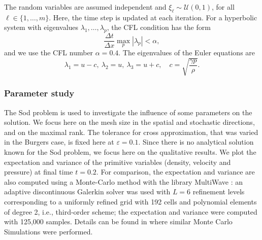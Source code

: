 \documentclass{article}
\begin{document}
The random variables are assumed independent and $\xi_\ell \sim \mathcal U(0,1)$, for all $\ell \in \{1,\dots,m\}$. 
Here, the time step is updated at each iteration. 
For a hyperbolic system with eigenvalues $\lambda_1,\dots,\lambda_p$, the CFL condition has the form 
\begin{equation} 
    \frac{\Delta t}{\Delta x}
    \max_p |\lambda_p| < \alpha,
\end{equation}
and we use the CFL number $\alpha=0.4$. The eigenvalues of the Euler equations are 
\begin{equation}
    \lambda_1 = u-c, \ \lambda_2 = u, \ \lambda_3 = u+c,
    \quad c = \sqrt{\frac{\gamma p}{\rho}}. 
\end{equation}

\subsubsection{Parameter study}

The Sod problem is used to investigate the influence of some parameters on the solution. 
We focus here on the mesh size in the spatial and stochastic directions, and on the maximal rank. 
The tolerance for cross approximation, that was varied in the Burgers case, is  fixed here at $\varepsilon=0.1$. 
Since there is no analytical solution known for the Sod problem, we focus here on the qualitative results.
We plot the expectation and variance of the primitive variables (density, velocity and pressure) at final time $t=0.2$.
For comparison, the expectation and variance are also computed using a Monte-Carlo method with the library MultiWave 
\cite{GerhardIaconoMayMuellerSchaefer:2015}: an adaptive discontinuous Galerkin solver was used with $L=6$ refinement levels corresponding 
to a uniformly refined grid with 192 cells and polynomial elements of degree 2, i.e., third-order scheme; the expectation and variance were computed with 125,000 samples.
Details can be found in \cite{herty_multiresolution_2024,pares_higher-dimensional_2024,Kolb:2024} where similar Monte Carlo Simulations were performed.
\end{document}
